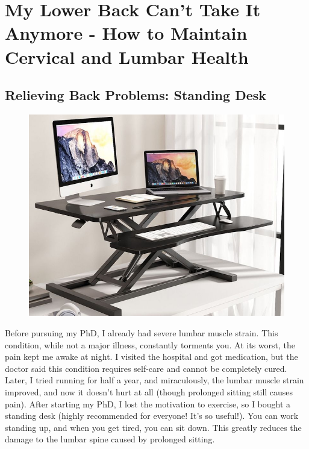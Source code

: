 \section{My Lower Back Can't Take It Anymore - How to Maintain Cervical and Lumbar Health}

\subsection{Relieving Back Problems: Standing Desk}

\begin{minipage}[t]{0.39\textwidth}
    \begin{figure}[H]
        \includegraphics[width=0.95\columnwidth, right]{author-folder/Yue.Zhou/gongzuotai.jpg}
    \end{figure}
\end{minipage}
\begin{minipage}[t]{0.6\textwidth}
    Before pursuing my PhD, I already had severe lumbar muscle strain. This condition, while not a major illness, constantly torments you. At its worst, the pain kept me awake at night. I visited the hospital and got medication, but the doctor said this condition requires self-care and cannot be completely cured. Later, I tried running for half a year, and miraculously, the lumbar muscle strain improved, and now it doesn't hurt at all (though prolonged sitting still causes pain). After starting my PhD, I lost the motivation to exercise, so I bought a standing desk (highly recommended for everyone! It's so useful!). You can work standing up, and when you get tired, you can sit down. This greatly reduces the damage to the lumbar spine caused by prolonged sitting.
\end{minipage}

